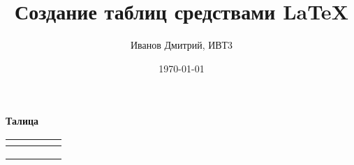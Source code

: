 \documentclass[a4paper,12pt]{article} %
\author{Иванов Дмитрий, ИВТ3}
\title{Создание таблиц средствами \LaTeX{}}
\date{\today}
\begin{document}
\maketitle
\newpage
\textbf{Талица}\\
\begin{tabular}{ |  p{30pt} | p{90pt} | p{30pt} | p{30pt} |p{30pt}|}
\hline
 &  & \multicolumn{3}{|c|}{}  \\ \hline
 &  &  &  & \\ \hline
 &  &   &   & \\ \hline
 &  &  &  & \\ \hline

\end{tabular}
\end{document}
